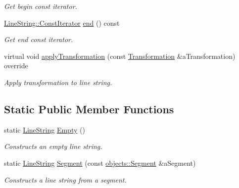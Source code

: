 \begin{DoxyCompactItemize}
\begin{DoxyCompactList}\small\item\em Get begin const iterator. \end{DoxyCompactList}\item 
\hyperlink{classlibrary_1_1math_1_1geom_1_1d3_1_1objects_1_1_line_string_a87db0104282f9fcccdc5b1b99e2301e5}{Line\+String\+::\+Const\+Iterator} \hyperlink{classlibrary_1_1math_1_1geom_1_1d3_1_1objects_1_1_line_string_a83d9d9ba96fc956a900a7cd2dbf3e82b}{end} () const
\begin{DoxyCompactList}\small\item\em Get end const iterator. \end{DoxyCompactList}\item 
virtual void \hyperlink{classlibrary_1_1math_1_1geom_1_1d3_1_1objects_1_1_line_string_a8a20f45b2af9cc45dbf7aff9e5d4824e}{apply\+Transformation} (const \hyperlink{classlibrary_1_1math_1_1geom_1_1d3_1_1_transformation}{Transformation} \&a\+Transformation) override
\begin{DoxyCompactList}\small\item\em Apply transformation to line string. \end{DoxyCompactList}\end{DoxyCompactItemize}
\subsection*{Static Public Member Functions}
\begin{DoxyCompactItemize}
\item 
static \hyperlink{classlibrary_1_1math_1_1geom_1_1d3_1_1objects_1_1_line_string}{Line\+String} \hyperlink{classlibrary_1_1math_1_1geom_1_1d3_1_1objects_1_1_line_string_ae9e05ddb3ab59060c78d18e19624f307}{Empty} ()
\begin{DoxyCompactList}\small\item\em Constructs an empty line string. \end{DoxyCompactList}\item 
static \hyperlink{classlibrary_1_1math_1_1geom_1_1d3_1_1objects_1_1_line_string}{Line\+String} \hyperlink{classlibrary_1_1math_1_1geom_1_1d3_1_1objects_1_1_line_string_a7fb1bcb80907e72aa55f0692ed2517f1}{Segment} (const \hyperlink{classlibrary_1_1math_1_1geom_1_1d3_1_1objects_1_1_segment}{objects\+::\+Segment} \&a\+Segment)
\begin{DoxyCompactList}\small\item\em Constructs a line string from a segment. \end{DoxyCompactList}\end{DoxyCompactItemize}


